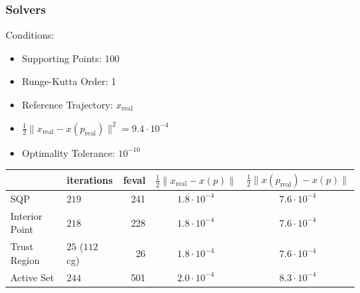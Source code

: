 \documentclass{beamer}
\begin{document}
\begin{frame}
    \frametitle{Solvers}
    Conditions:
    \begin{itemize}
        \item{Supporting Points: 100}
        \item{Runge-Kutta Order: 1}
        \item{Reference Trajectory: $x_{\text{real}}$}
        \item{$\frac{1}{2}\|x_{\text{real}} - x(p_\text{real})\|^2 = 9.4 \cdot 10^{-4}$}
        \item{Optimality Tolerance: $10^{-10}$}
    \end{itemize}

     \vspace{0.5cm}

     \begin{tabular}{l|lrcc}
         & iterations & feval & $\frac{1}{2}\|x_{\text{real}} - x(p)\|$ &  $\frac{1}{2}\|x(p_{\text{real}}) - x(p)\|$ \\
         \hline
         SQP             & $219$ & 241 & $1.8 \cdot 10^{-4}$ & $7.6 \cdot 10^{-4}$ \\
         Interior Point  & $218$ & 228 & $1.8 \cdot 10^{-4}$ & $7.6 \cdot 10^{-4}$ \\
         Trust Region    & $25$ ($112$ cg) & 26 & $1.8 \cdot 10^{-4}$ & $7.6 \cdot 10^{-4}$ \\
         Active Set      & $244$  & 501 & $2.0 \cdot 10^{-4}$ & $8.3 \cdot 10^{-4}$ \\
     \end{tabular}
\end{frame}
\end{document}
